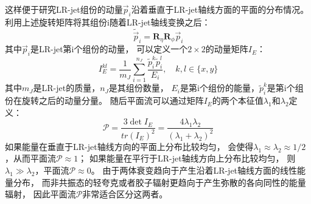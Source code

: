 这样便于研究LR-jet组份的动量$\vec{p}_i$沿着垂直于LR-jet轴线方面的平面的分布情况。
利用上述旋转矩阵将其组份i随着LR-jet轴线变换之后：
\begin{equation} 
\label{eq:JSS11}
\tilde{\vec{p}}_i=\mathbf{R}_{\eta}\mathbf{R}_{\phi}\vec{p}_i
\end{equation}
其中$\vec{p}_i$是LR-jet第i个组份的动量，
可以定义一个$2\times 2$的动量矩阵$I_E$：
\begin{equation} 
\label{eq:JSS12}
I_E^{kl}=\frac{1}{m_J} \sum_{i=1}^{n_J} \frac{\tilde{p}_i^k\tilde{p}_i^l}{E_i}, \quad k,l \in \{x,y\}
\end{equation}
其中$m_J$是LR-jet的质量，$n_J$是其组份数量，
$E_i$是第i个组份的能量，$\tilde{p}_i^k$是第i个组份在旋转之后的动量分量。
随后平面流可以通过矩阵$I_E$的两个本征值$\lambda_1$和$\lambda_2$定义：
\begin{equation} 
\label{eq:JSS13}
\mathcal{P}=\frac{3\det{I_E}}{tr(I_E)^2}=\frac{4\lambda_1\lambda_2}{(\lambda_1+\lambda_2)^2}
\end{equation}
如果能量在垂直于LR-jet轴线方向的平面上分布比较均匀，
会使得$\lambda_1\approx\lambda_2\approx 1/2$，从而平面流$\mathcal{P}\approx 1$；
如果能量在平行于LR-jet轴线方向上分布比较均匀，
则$\lambda_1\gg \lambda_2$，平面流$\mathcal{P}\approx 0$。
由于两体衰变趋向于产生沿着LR-jet轴线方面的线性能量分布，
而非共振态的轻夸克或者胶子辐射更趋向于产生弥散的各向同性的能量辐射，
因此平面流$\mathcal{P}$非常适合区分这两者。










































